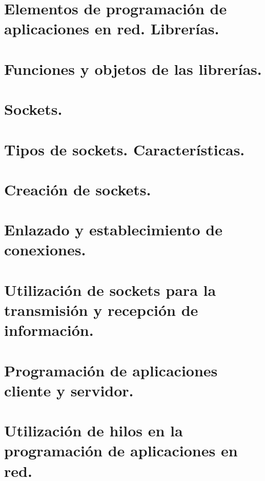 \documentclass[a4paper,12pt,spanish]{sphinxmanual}
\begin{document}
\section{Elementos de programación de aplicaciones en red. Librerías.}
\label{textos/tema3:elementos-de-programacion-de-aplicaciones-en-red-librerias}

\section{Funciones y objetos de las librerías.}
\label{textos/tema3:funciones-y-objetos-de-las-librerias}

\section{Sockets.}
\label{textos/tema3:sockets}

\section{Tipos de sockets. Características.}
\label{textos/tema3:tipos-de-sockets-caracteristicas}

\section{Creación de sockets.}
\label{textos/tema3:creacion-de-sockets}

\section{Enlazado y establecimiento de conexiones.}
\label{textos/tema3:enlazado-y-establecimiento-de-conexiones}

\section{Utilización de sockets para la transmisión y recepción de información.}
\label{textos/tema3:utilizacion-de-sockets-para-la-transmision-y-recepcion-de-informacion}

\section{Programación de aplicaciones cliente y servidor.}
\label{textos/tema3:programacion-de-aplicaciones-cliente-y-servidor}

\section{Utilización de hilos en la programación de aplicaciones en red.}
\label{textos/tema3:utilizacion-de-hilos-en-la-programacion-de-aplicaciones-en-red}
\end{document}
